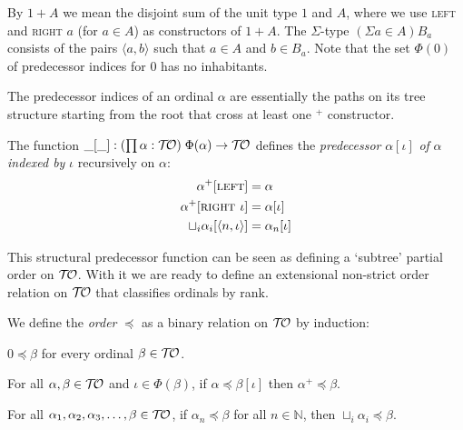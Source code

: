 By $1 + A$ we mean the disjoint sum of the unit type $1$ and $A$,
where we use \textsc{left} and \textsc{right $a$} (for $a \in A$) as
constructors of $1 + A$.
The $\Sigma$-type $(\Sigma a \in A) B_a$ consists of the pairs
$\langle a, b \rangle$ such that $a \in A$ and $b \in B_a$.
Note that the set $\Phi(0)$ of predecessor indices for $0$ has no
inhabitants.

The predecessor indices of an ordinal $\alpha$ are essentially the
paths on its tree structure starting from the root that cross at least
one $^+$ constructor.

\begin{definition}%
The function $\_[\_] : (\prod \alpha : \mathcal{T\!O}) \; \Phi(\alpha)
\rightarrow \mathcal{T\!O}$ defines the \emph{predecessor} $\alpha[\iota]$
\emph{of} $\alpha$ \emph{indexed by} $\iota$ recursively on $\alpha$:
\begin{align*}
  \alpha^+[\textsc{left}]                     &= \alpha \\
  \alpha^+[\textsc{right $\iota$}]            &= \alpha[\iota] \\
  \sqcup_i \alpha_i[\langle n, \iota \rangle] &= \alpha_n[\iota]
\end{align*}
\end{definition}

This structural predecessor function can be seen as defining a `subtree'
partial order on $\mathcal{T\!O}$. With it we are ready to define an extensional
non-strict order relation on $\mathcal{T\!O}$ that classifies ordinals by rank.

\begin{definition}\label{def:order}%
We define the \emph{order} $\preceq$ as a binary relation on $\mathcal{T\!O}$ by
induction:
\begin{compactenum}
  \item
    $0 \preceq \beta$ for every ordinal $\beta \in \mathcal{T\!O}$.
  \item\label{def:order:succ}
    For all $\alpha, \beta \in \mathcal{T\!O}$ and $\iota \in \Phi(\beta)$, if
    $\alpha \preceq \beta[\iota]$ then $\alpha^+ \preceq \beta$.
  \item
    For all $\alpha_1, \alpha_2, \alpha_3, \ldots, \beta \in \mathcal{T\!O}$, if
    $\alpha_n \preceq \beta$ for all $n \in \mathbb{N}$, then $\sqcup_i
    \alpha_i \preceq \beta$.
\end{compactenum}
\end{definition}

